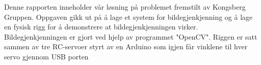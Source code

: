 Denne rapporten inneholder vår løsning på problemet fremstilt av Kongsberg Gruppen.
Oppgaven gikk ut på å lage et system for bildegjenkjenning og å lage en fysisk rigg
for å demonstrere at bildegjenkjenningen virker.
Bildegjenkjenningen er gjort ved hjelp av programmet "OpenCV".
Riggen er satt sammen av tre RC-servoer styrt av en Arduino som igjen
får vinklene til hver servo gjennom USB porten
